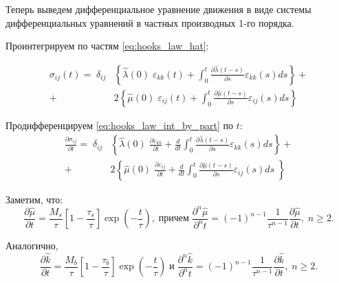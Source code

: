 \documentclass[a4paper, fontsize=14pt]{article}
\begin{document}
Теперь выведем дифференциальное уравнение движения в виде системы дифференциальных уравнений в частных производных 1-го порядка.

Проинтегрируем по частям \eqref{eq:hooks_law_hat}:

\begin{equation}
    \label{eq:hooks_law_int_by_part}
    \begin{aligned}
        \sigma_{ij}(t) = \; \delta_{ij} &\left\{\hat{\lambda}(0) \; \varepsilon_{kk}(t) + \int_0^t \frac{\partial \hat{\lambda}(t - s)}{\partial s}  \varepsilon_{kk}(s) ds \right\} + \\
        + & 2 \left\{\hat{\mu}(0) \; \varepsilon_{ij}(t) + \int_0^t \frac{\partial \hat{\mu}(t - s)}{\partial s}  \varepsilon_{ij}(s) ds \right\}
    \end{aligned}
\end{equation}

Продифференцируем \eqref{eq:hooks_law_int_by_part} по $t$:
\begin{equation}
    \label{eq:hooks_law_int_by_part_differentiate}
    \begin{aligned}
        \frac{\partial \sigma_{ij}}{\partial t}  = \; \delta_{ij} &\left\{\hat{\lambda}(0) \; \frac{\partial \varepsilon_{kk}}{\partial t}  + \frac{d}{dt} \int_0^t \frac{\partial \hat{\lambda}(t - s)}{\partial s}  \varepsilon_{kk}(s) ds \right\} + \\
        + & 2 \left\{\hat{\mu}(0) \; \frac{\partial \varepsilon_{ij}}{\partial t} + \frac{d}{dt} \int_0^t \frac{\partial \hat{\mu}(t - s)}{\partial s}  \varepsilon_{ij}(s) ds \; \right\}
    \end{aligned}
\end{equation}

Заметим, что:
\begin{equation}
    \label{eq:mu_t}
    \frac{\partial \hat{\mu}}{\partial t} = \frac{M_s}{\tau} \left[1 - \frac{\tau_s}{\tau} \right] \exp \left( - \frac{t}{\tau}\right), \; \text{причем} \;  \frac{\partial^n \hat{\mu}}{\partial^n t} = (-1)^{n - 1} \frac{1}{\tau^{n-1}} \frac{\partial \hat{\mu}}{\partial t}, \; n \geq 2. 
\end{equation}

Аналогично,
\begin{equation}
    \label{eq:k_t}
    \frac{\partial \hat{k}}{\partial t} = \frac{M_b}{\tau} \left[1 - \frac{\tau_b}{\tau} \right] \exp \left( - \frac{t}{\tau}\right)  \; \text{и} \;  \frac{\partial^n \hat{k}}{\partial^n t} = (-1)^{n - 1} \frac{1}{\tau^{n-1}} \frac{\partial \hat{k}}{\partial t}, \; n \geq 2. 
\end{equation}
\end{document}
